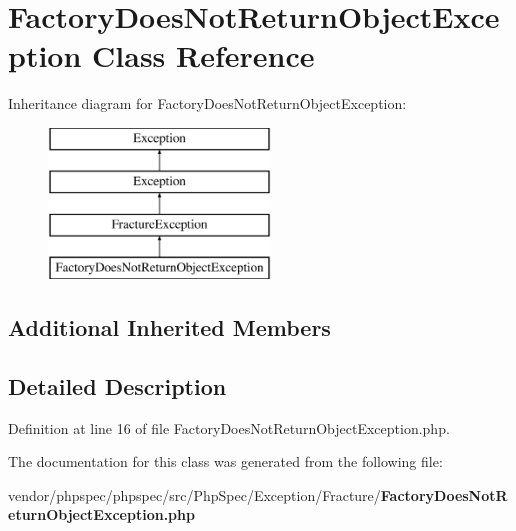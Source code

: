 \section{Factory\+Does\+Not\+Return\+Object\+Exception Class Reference}
\label{class_php_spec_1_1_exception_1_1_fracture_1_1_factory_does_not_return_object_exception}
Inheritance diagram for Factory\+Does\+Not\+Return\+Object\+Exception\+:\begin{figure}[H]
\begin{center}
\leavevmode
\includegraphics[height=4.000000cm]{class_php_spec_1_1_exception_1_1_fracture_1_1_factory_does_not_return_object_exception}
\end{center}
\end{figure}
\subsection*{Additional Inherited Members}


\subsection{Detailed Description}


Definition at line 16 of file Factory\+Does\+Not\+Return\+Object\+Exception.\+php.



The documentation for this class was generated from the following file\+:\begin{DoxyCompactItemize}
\item 
vendor/phpspec/phpspec/src/\+Php\+Spec/\+Exception/\+Fracture/{\bf Factory\+Does\+Not\+Return\+Object\+Exception.\+php}\end{DoxyCompactItemize}
